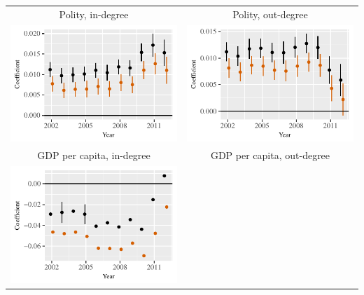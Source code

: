 \documentclass[reqno,onecolumn,letterpaper,12pt]{article}
\begin{document}
\begin{longtable}{c@{\hskip -.4cm}c}
Polity, in-degree &
Polity, out-degree\\
\includegraphics[height=.2\textheight, clip=true, trim=0cm .5cm 0cm .1cm]{draft_figures/rl_plots/Polity_in.pdf}   &
\includegraphics[height=.2\textheight, clip=true, trim=.5cm .5cm 0cm .1cm]{draft_figures/rl_plots/Polity_out.pdf}   \\
GDP per capita, in-degree &
GDP per capita,  out-degree\\
\includegraphics[height=.2\textheight, clip=true, trim=0cm .5cm 0cm .1cm]{draft_figures/rl_plots/GDPpc_in.pdf} &

\end{longtable}
\end{document}
